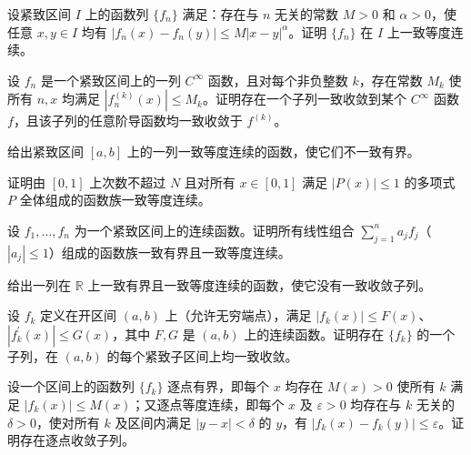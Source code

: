 \noindent\begin{minipage}{\textwidth}
设紧致区间 $I$ 上的函数列 $\{f_n\}$ 满足：存在与 $n$ 无关的常数 $M>0$ 和 $\alpha>0$，使任意 $x,y\in I$ 均有 $|f_n(x)-f_n(y)|\le M|x-y|^\alpha$。证明 $\{f_n\}$ 在 $I$ 上一致等度连续。
\end{minipage}\par\vfill
\noindent\begin{minipage}{\textwidth}
设 $f_n$ 是一个紧致区间上的一列 $C^\infty$ 函数，且对每个非负整数 $k$，存在常数 $M_k$ 使所有 $n,x$ 均满足 $|f_n^{(k)}(x)|\le M_k$。证明存在一个子列一致收敛到某个 $C^\infty$ 函数 $f$，且该子列的任意阶导函数均一致收敛于 $f^{(k)}$。
\end{minipage}\par\vfill
\noindent\begin{minipage}{\textwidth}
给出紧致区间 $[a,b]$ 上的一列一致等度连续的函数，使它们不一致有界。
\end{minipage}\par\vfill
\newpage
\noindent\begin{minipage}{\textwidth}
证明由 $[0,1]$ 上次数不超过 $N$ 且对所有 $x\in[0,1]$ 满足 $|P(x)|\le1$ 的多项式 $P$ 全体组成的函数族一致等度连续。
\end{minipage}\par\vfill
\noindent\begin{minipage}{\textwidth}
设 $f_1,\ldots,f_n$ 为一个紧致区间上的连续函数。证明所有线性组合 $\sum_{j=1}^n a_jf_j$（$|a_j|\le1$）组成的函数族一致有界且一致等度连续。
\end{minipage}\par\vfill
\noindent\begin{minipage}{\textwidth}
给出一列在 $\mathbb R$ 上一致有界且一致等度连续的函数，使它没有一致收敛子列。
\end{minipage}\par\vfill
\noindent\begin{minipage}{\textwidth}
设 $f_k$ 定义在开区间 $(a,b)$ 上（允许无穷端点），满足 $|f_k(x)|\le F(x)$、$|f_k^{\prime}(x)|\le G(x)$，其中 $F,G$ 是 $(a,b)$ 上的连续函数。证明存在 $\{f_k\}$ 的一个子列，在 $(a,b)$ 的每个紧致子区间上均一致收敛。
\end{minipage}\par\vfill
\newpage
\noindent\begin{minipage}{\textwidth}
设一个区间上的函数列 $\{f_k\}$ 逐点有界，即每个 $x$ 均存在 $M(x)>0$ 使所有 $k$ 满足 $|f_k(x)|\le M(x)$；又逐点等度连续，即每个 $x$ 及 $\varepsilon>0$ 均存在与 $k$ 无关的 $\delta>0$，使对所有 $k$ 及区间内满足 $|y-x|<\delta$ 的 $y$，有 $|f_k(x)-f_k(y)|\le\varepsilon$。证明存在逐点收敛子列。
\end{minipage}\par\vfill
